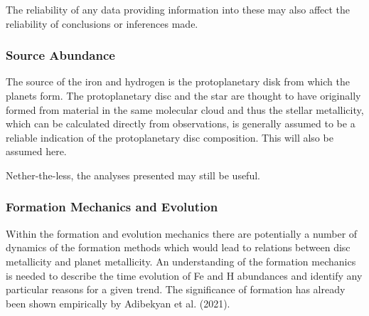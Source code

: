 \documentclass[a4paper,twocolumn,12pt]{article}
\begin{document}
The reliability of any data providing information into these may also affect the reliability of conclusions or inferences made.


\subsubsection{Source Abundance}
The source of the iron and hydrogen is the protoplanetary disk from which the planets form. %
The protoplanetary disc and the star are thought to have originally formed from material in the same molecular cloud and thus the stellar metallicity, which can be calculated directly from observations, is generally assumed to be a reliable indication of the protoplanetary disc composition. This will also be assumed here.

Nether-the-less, the analyses presented may still be useful.



\subsubsection{Formation Mechanics and Evolution}
Within the formation and evolution mechanics there are potentially a number of dynamics of the formation methods which would lead to relations between disc metallicity and planet metallicity. An understanding of the formation mechanics is needed to describe the time evolution of Fe and H abundances and identify any particular reasons for a given trend. The significance of formation has already been shown empirically by Adibekyan et al. (2021).


\end{document}
